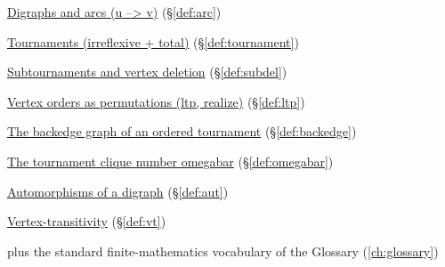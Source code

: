 \begin{closurepanel}
\item \hyperref[def:arc]{Digraphs and arcs (u --> v)} (\S\ref*{def:arc})
\item \hyperref[def:tournament]{Tournaments (irreflexive + total)} (\S\ref*{def:tournament})
\item \hyperref[def:subdel]{Subtournaments and vertex deletion} (\S\ref*{def:subdel})
\item \hyperref[def:ltp]{Vertex orders as permutations (ltp, realize)} (\S\ref*{def:ltp})
\item \hyperref[def:backedge]{The backedge graph of an ordered tournament} (\S\ref*{def:backedge})
\item \hyperref[def:omegabar]{The tournament clique number omegabar} (\S\ref*{def:omegabar})
\item \hyperref[def:aut]{Automorphisms of a digraph} (\S\ref*{def:aut})
\item \hyperref[def:vt]{Vertex-transitivity} (\S\ref*{def:vt})
\item plus the standard finite-mathematics vocabulary of the Glossary (\cref{ch:glossary})
\end{closurepanel}
